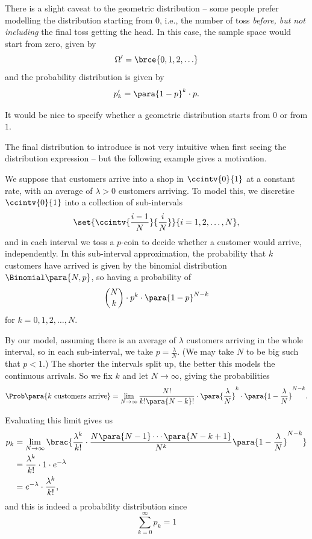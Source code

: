 There is a slight caveat to the geometric distribution -- some people prefer modelling the distribution starting from \(0\), i.e., the number of toss \emph{before, but not including} the final toss getting the head. In this case, the sample space would start from zero, given by
\[
    \Omega' = \brce{0, 1, 2, \ldots}
\]
and the probability distribution is given by
\[
    p'_k = \para{1 - p}^{k} \cdot p.
\]

It would be nice to specify whether a geometric distribution starts from \(0\) or from \(1\).

The final distribution to introduce is not very intuitive when first seeing the distribution expression -- but the following example gives a motivation.

\begin{example}
    We suppose that customers arrive into a shop in \(\ccintv{0}{1}\) at a constant rate, with an average of \(\lambda > 0\) customers arriving. To model this, we discretise \(\ccintv{0}{1}\) into a collection of sub-intervals
    \[
        \set{\ccintv{\frac{i - 1}{N}}{\frac{i}{N}}}{i = 1, 2, \ldots, N},
    \]
    and in each interval we toss a \(p\)-coin to decide whether a customer would arrive, independently. In this sub-interval approximation, the probability that \(k\) customers have arrived is given by the binomial distribution \(\Binomial\para{N, p}\), so having a probability of
    \[
        \binom{N}{k} \cdot p^k \cdot \para{1 - p}^{N - k}
    \]
    for \(k = 0, 1, 2, \ldots, N\).

    By our model, assuming there is an average of \(\lambda\) customers arriving in the whole interval, so in each sub-interval, we take \(p = \frac{\lambda}{N}\). (We may take \(N\) to be big such that \(p < 1\).) The shorter the intervals split up, the better this models the continuous arrivals. So we fix \(k\) and let \(N \to \infty\), giving the probabilities
    \[
        \Prob\para{k\text{ customers arrive}} = \lim_{N \to \infty} \frac{N!}{k! \para{N - k}!} \cdot \para{\frac{\lambda}{N}}^k \cdot \para{1 - \frac{\lambda}{N}}^{N - k}.
    \]

    Evaluating this limit gives us
    \begin{align*}
        p_k &= \lim_{N \to \infty} \brac{\frac{\lambda^k}{k!} \cdot \frac{N \para{N - 1} \cdots \para{N - k + 1}}{N^k} \para{1 - \frac{\lambda}{N}}^{N - k}}\\
        &= \frac{\lambda^k}{k!} \cdot 1 \cdot e^{-\lambda} \\
        &= e^{-\lambda} \cdot \frac{\lambda^{k}}{k!},
    \end{align*}
    and this is indeed a probability distribution since
    \[
        \sum_{k = 0}^{\infty} p_k = 1
    \]
\end{example}

